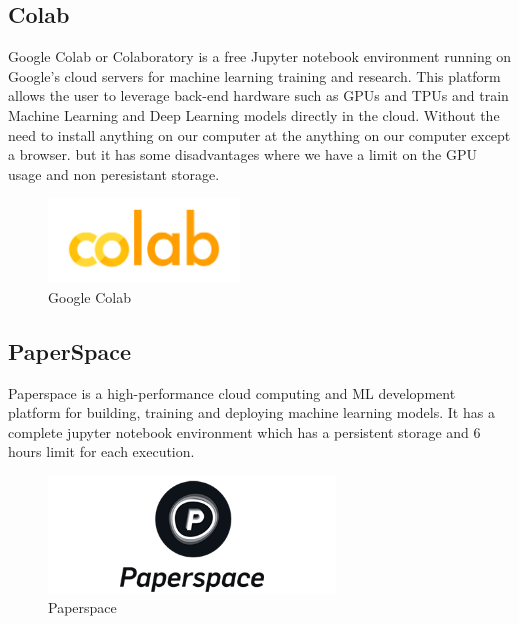\subsection{Colab}
\hspace{\parindent}
Google Colab or Colaboratory is a free Jupyter notebook environment running on Google's cloud servers for machine learning training and research. This platform allows the user to leverage back-end hardware such as GPUs and TPUs and train Machine Learning and Deep Learning models directly in the cloud. Without the need to install anything on our computer at the anything on our computer except a browser.
but it has some disadvantages where we have a limit on the GPU usage
and non peresistant storage.

\begin{figure}[H]
\centering
  \vspace{-0.1in}
    \centerline{\includegraphics[width = 2in]{../images/colab.png}}
    \caption{Google Colab}
    \label{Google Colab}
\end{figure}

\subsection{PaperSpace}
\hspace{\parindent}
Paperspace is a high-performance cloud computing and ML development platform for building, training and deploying machine learning models. It has a complete jupyter notebook environment which has a persistent storage and 6 hours limit for each execution.

\begin{figure}[H]
    \centering
      \vspace{-0.1in}
        \centerline{\includegraphics[width = 3in]{../images/paperspace.png}}
        \caption{Paperspace}
        \label{Paperspace}
    \end{figure}

